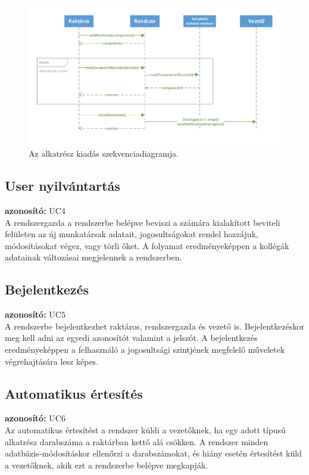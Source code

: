 \documentclass[12pt]{article}\usepackage[left=20mm,right=20mm,top=14mm,bottom=20mm]{geometry}
\begin{document}
\begin{figure}[!h]
    \centering
        \includegraphics[width=\textwidth]{kepek/alkatresz_kiadas_SD.pdf}
        \caption{Az alkatrész kiadás szekvenciadiagramja.\label{fig:kiadas}}
\end{figure}

\subsection{User nyilvántartás}
\textbf{azonosító: } UC4 \\
A rendszergazda a rendszerbe belépve beviszi a számára kialakított beviteli felületen az új munkatársak adatait, jogosultságokat rendel hozzájuk, módosításokat végez, vagy törli őket. 
A folyamat eredményeképpen a kollégák adatainak változásai megjelennek a rendszerben.

\subsection{Bejelentkezés}
\textbf{azonosító: } UC5 \\
A rendszerbe bejelentkezhet raktáros, rendszergazda és vezető is.
Bejelentkezéskor meg kell adni az egyedi azonosítót valamint a jelszót.
A bejelentkezés eredményeképpen a felhasználó a jogosultsági szintjének megfelelő műveletek végrehajtására lesz képes.

\subsection{Automatikus értesítés}
\textbf{azonosító: } UC6 \\
Az automatikus értesítést a rendszer küldi a vezetőknek, ha egy adott típusú alkatrész darabszáma a raktárban kettő alá csökken.
A rendszer minden adatbázis-módosításkor ellenőrzi a darabszámokat, és hiány esetén értesítést küld a vezetőknek, akik ezt a rendszerbe belépve megkapják.
\end{document}
